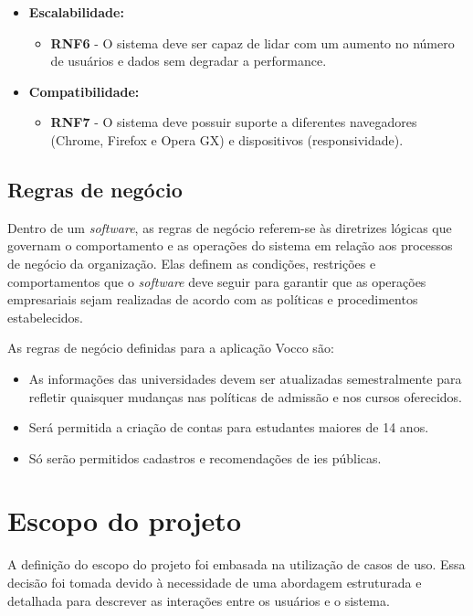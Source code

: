 \begin{itemize}
    \item \textbf{Escalabilidade:}
    \begin{itemize}
        \item \textbf{RNF6} - O sistema deve ser capaz de lidar com um aumento no número de usuários e dados sem degradar a performance.
    \end{itemize}

    \item \textbf{Compatibilidade:}
    \begin{itemize}
        \item \textbf{RNF7} - O sistema deve possuir suporte a diferentes navegadores (Chrome, Firefox e Opera GX) e dispositivos (responsividade).
    \end{itemize}

\end{itemize}



\subsection{Regras de negócio}

Dentro de um \textit{software}, as regras de negócio referem-se às diretrizes lógicas que governam o comportamento e as operações do sistema em relação aos processos de negócio da organização. Elas definem as condições, restrições e comportamentos que o \textit{software} deve seguir para garantir que as operações empresariais sejam realizadas de acordo com as políticas e procedimentos estabelecidos.

As regras de negócio definidas para a aplicação Vocco são:
\begin{itemize}
\item {As informações das universidades devem ser atualizadas semestralmente para refletir quaisquer mudanças nas políticas de admissão e nos cursos oferecidos.}
\item {Será permitida a criação de contas para estudantes maiores de 14 anos.}
\item {Só serão permitidos cadastros e recomendações de \ac{ies} públicas. 
}

\end{itemize}


\section{Escopo do projeto}
A definição do escopo do projeto foi embasada na utilização de casos de uso. Essa decisão foi tomada devido à necessidade de uma abordagem estruturada e detalhada para descrever as interações entre os usuários e o sistema. 


